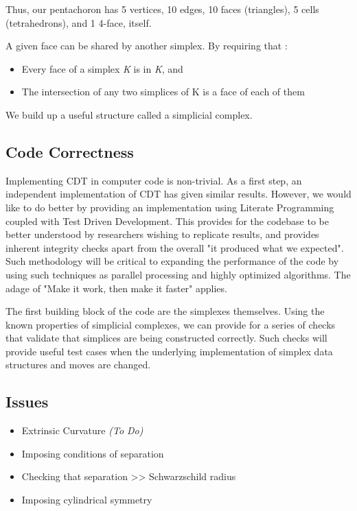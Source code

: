 \documentclass{article}
\begin{document}
Thus, our pentachoron has 5 vertices, 10 edges, 10 faces (triangles), 5 cells (tetrahedrons), and 1 4-face, itself.

A given face can be shared by another simplex. By requiring that \cite{weisstein1}:

\begin{itemize}
\item Every face of a simplex \emph{K} is in \emph{K}, and
\item The intersection of any two simplices of K is a face of each of them
\end{itemize}

We build up a useful structure called a simplicial complex.

\subsection{Code Correctness}

Implementing CDT in computer code is non-trivial. As a first step, an independent implementation of CDT has given similar results. \cite{kommu2011} However, we would like to do better by providing an implementation using Literate Programming coupled with Test Driven Development. This provides for the codebase to be better understood by researchers wishing to replicate results, and provides inherent integrity checks apart from the overall "it produced what we expected". Such methodology will be critical to expanding the performance of the code by using such techniques as parallel processing and highly optimized algorithms. The adage of "Make it work, then make it faster" applies.

The first building block of the code are the simplexes themselves. Using the known properties of simplicial complexes, we can provide for a series of checks that validate that simplices are being constructed correctly. Such checks will provide useful test cases when the underlying implementation of simplex data structures and moves are changed.

\subsection{Issues}

\begin{itemize}
\item Extrinsic Curvature \emph{(To Do)}
\item Imposing conditions of separation
\item Checking that separation >\textcompwordmark{}> Schwarzschild radius
\item Imposing cylindrical symmetry
\end{itemize}
\end{document}
